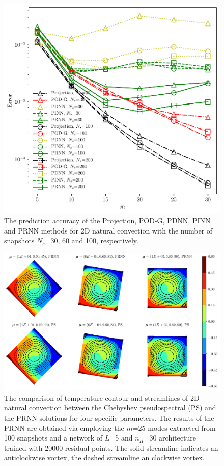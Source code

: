 \documentclass[preprint, 10pt]{elsarticle}
\begin{document}
\begin{figure}[!ht]
  \centering
  \includegraphics[width=12cm]{../../pythonNN/2DNaturalConvection/fig/ErrorComparsion_SampleNum.pdf}
\caption{The prediction accuracy of the Projection, POD-G, PDNN, PINN and PRNN methods for 2D natural convection with the number of snapshots $N_s$=30, 60 and 100, respectively.}
\label{fig_2DNaturalConvectionErrorComparsion_SampleNum}
\end{figure}

\begin{figure}[!ht]
  \centering
  \includegraphics[width=16cm]{../../pythonNN/2DNaturalConvection/fig/ResultComparsion.pdf}
\caption{The comparison of temperature contour and streamlines of 2D natural convection between the Chebyshev pseudospectral (PS) and the PRNN solutions for four specific parameters. The results of the PRNN are obtained via employing the $m$=25 modes extracted from 100 snapshots and a network of $L$=5 and $n_H$=30 architecture trained with 20000 residual points. The solid streamline indicates an anticlockwise vortex, the dashed streamline an clockwise vortex.}
\label{fig_2DNaturalConvectionResultComparsion}
\end{figure}
\end{document}
